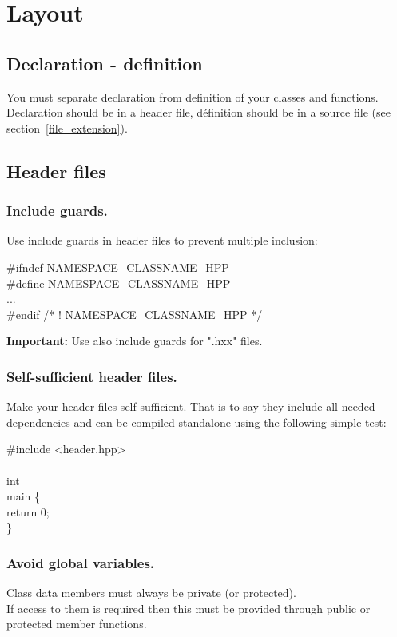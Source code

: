 \section{Layout}

\subsection{Declaration - definition}
You must separate declaration from definition of your classes and
functions.\\
Declaration should be in a header file, définition should be in a
source file (see section~\ref{file_extension}).

\subsection{Header files}
\subsubsection{Include guards.}
\label{sec:include_guards}
Use include guards in header files to prevent multiple inclusion:
\begin{algorithm}[H]
\#ifndef NAMESPACE\_CLASSNAME\_HPP \\
\#define NAMESPACE\_CLASSNAME\_HPP \\
... \\
\#endif /* ! NAMESPACE\_CLASSNAME\_HPP */
\end{algorithm}
{\bf Important: } Use also include guards for ".hxx" files.

\subsubsection{Self-sufficient header files.}
Make your header files self-sufficient. That is to say they include
all needed dependencies and can be compiled standalone using the
following simple test:
\begin{algorithm}[H]
\#include <header.hpp> \\
 \\
int \\
main \{ \\
return 0; \\
\}
\end{algorithm}

\subsubsection{Avoid global variables.}
Class data members must always be private (or protected).\\
If access to them is required then this must be provided through
public or protected member functions.

